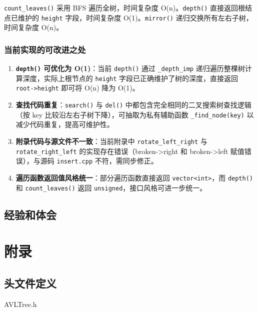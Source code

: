 \documentclass[a4paper, 12pt, oneside]{article}
\theoremstyle{cn_theorem}
\begin{document}
\texttt{count\_leaves()} 采用 BFS 遍历全树，时间复杂度 O(n)。\texttt{depth()} 直接返回根结点已维护的 \texttt{height} 字段，时间复杂度 O(1)。\texttt{mirror()} 递归交换所有左右子树，时间复杂度 O(n)。

\subsubsection{当前实现的可改进之处}

\begin{enumerate}
    \item \textbf{\texttt{depth()} 可优化为 O(1)}：当前 \texttt{depth()} 通过 \texttt{\_depth\_imp} 递归遍历整棵树计算深度，实际上根节点的 \texttt{height} 字段已正确维护了树的深度，直接返回 \texttt{root->height} 即可将 O(n) 降为 O(1)。
    \item \textbf{查找代码重复}：\texttt{search()} 与 \texttt{del()} 中都包含完全相同的二叉搜索树查找逻辑（按 key 比较沿左右子树下降），可抽取为私有辅助函数 \texttt{\_find\_node(key)} 以减少代码重复，提高可维护性。
    \item \textbf{附录代码与源文件不一致}：当前附录中 \texttt{rotate\_left\_right} 与 \texttt{rotate\_right\_left} 的实现存在错误（broken->right 和 broken->left 赋值错误），与源码 \texttt{insert.cpp} 不符，需同步修正。
    \item \textbf{遍历函数返回值风格统一}：部分遍历函数直接返回 \texttt{vector<int>}，而 \texttt{depth()} 和 \texttt{count\_leaves()} 返回 \texttt{unsigned}，接口风格可进一步统一。
\end{enumerate}


\subsection{经验和体会}


\clearpage
\section{附录}

\subsection{头文件定义}
AVLTree.h
\end{document}
